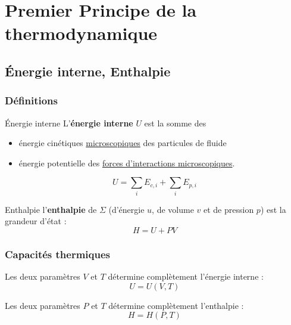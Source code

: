 \chapter{Premier Principe de la thermodynamique} %
\label{chap:Premier Principe de la thermodynamique}

\section{Énergie interne, Enthalpie} %
\label{sec:Énergie interne}

\subsection{Définitions} %


\begin{Definition}[colbacktitle=red!75!black]{Énergie interne}{}
L'\textbf{énergie interne} $U$ est la somme des 
\begin{itemize}

    \item énergie cinétiques \underline{microscopiques} des particules de fluide

    \item énergie potentielle des \underline{forces d'interactions microscopiques}. 
\end{itemize}

\begin{equation}
  U = \sum_{i}{E _{c,i}} + \sum_{i}{E _{p, i}}
\end{equation}
\end{Definition}

\begin{Definition}[colbacktitle=red!75!black]{Enthalpie}{}
l'\textbf{enthalpie} de $\Sigma$ (d'énergie $u$, de volume $v$ et de pression $p$) est la grandeur d'état : 
\begin{equation}
  H = U + PV
\end{equation}
\end{Definition}






\subsection{Capacités thermiques} %
\label{sub:Capacités thermiques}

\begin{Theorem}{}{}
Les deux paramètres $V$ et $T$ détermine complètement l'énergie interne : 
\begin{equation}
  U = U(V,T)
\end{equation}

Les deux paramètres $P$ et $T$ détermine complètement l'enthalpie : 
\begin{equation}
  H = H(P,T)
\end{equation}
\end{Theorem}

